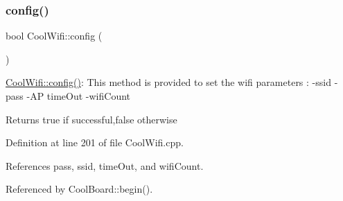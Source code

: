 \subsubsection{\texorpdfstring{config()}{config()}\hspace{0.1cm}{\footnotesize\ttfamily [1/2]}}
{\footnotesize\ttfamily bool Cool\+Wifi\+::config (\begin{DoxyParamCaption}{ }\end{DoxyParamCaption})}

\hyperlink{classCoolWifi_a4eb2f6b9b09dd588964b88b6c70122c0}{Cool\+Wifi\+::config()}\+: This method is provided to set the wifi parameters \+: -\/ssid -\/pass -\/\+AP time\+Out -\/wifi\+Count

\begin{DoxyReturn}{Returns}
true if successful,false otherwise 
\end{DoxyReturn}


Definition at line 201 of file Cool\+Wifi.\+cpp.



References pass, ssid, time\+Out, and wifi\+Count.



Referenced by Cool\+Board\+::begin().



